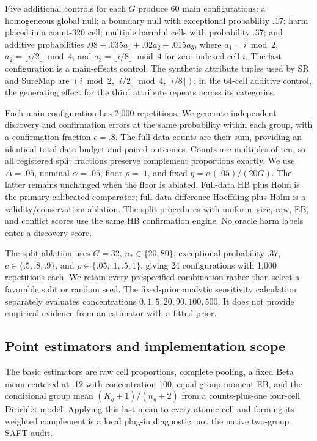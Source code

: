 \documentclass[Afour,sageh,times,doublespace]{sagej}
\begin{document}
Five additional controls for each $G$ produce 60 main configurations: a homogeneous global null; a boundary null with exceptional probability .17; harm placed in a count-320 cell; multiple harmful cells with probability .37; and additive probabilities $.08+.035a_1+.02a_2+.015a_3$, where $a_1=i\bmod2$, $a_2=\lfloor i/2\rfloor\bmod4$, and $a_3=\lfloor i/8\rfloor\bmod4$ for zero-indexed cell $i$. The last configuration is a main-effects control. The synthetic attribute tuples used by SR and SureMap are $(i\bmod2,\lfloor i/2\rfloor\bmod4,\lfloor i/8\rfloor)$; in the 64-cell additive control, the generating effect for the third attribute repeats across its categories.

Each main configuration has 2,000 repetitions. We generate independent discovery and confirmation errors at the same probability within each group, with a confirmation fraction $c=.8$. The full-data counts are their sum, providing an identical total data budget and paired outcomes. Counts are multiples of ten, so all registered split fractions preserve complement proportions exactly. We use $\Delta=.05$, nominal $\alpha=.05$, floor $\rho=.1$, and fixed $\eta=\alpha(.05)/(20G)$. The latter remains unchanged when the floor is ablated. Full-data HB plus Holm is the primary calibrated comparator; full-data difference-Hoeffding plus Holm is a validity/conservatism ablation. The split procedures with uniform, size, raw, EB, and conflict scores use the same HB confirmation engine. No oracle harm labels enter a discovery score.

The split ablation uses $G=32$, $n_*\in\{20,80\}$, exceptional probability .37, $c\in\{.5,.8,.9\}$, and $\rho\in\{.05,.1,.5,1\}$, giving 24 configurations with 1,000 repetitions each. We retain every prespecified combination rather than select a favorable split or random seed. The fixed-prior analytic sensitivity calculation separately evaluates concentrations $0,1,5,20,90,100,500$. It does not provide empirical evidence from an estimator with a fitted prior.

\subsection{Point estimators and implementation scope}
The basic estimators are raw cell proportions, complete pooling, a fixed Beta mean centered at .12 with concentration 100, equal-group moment EB, and the conditional group mean $(K_g+1)/(n_g+2)$ from a counts-plus-one four-cell Dirichlet model. Applying this last mean to every atomic cell and forming its weighted complement is a local plug-in diagnostic, not the native two-group SAFT audit.
\end{document}
